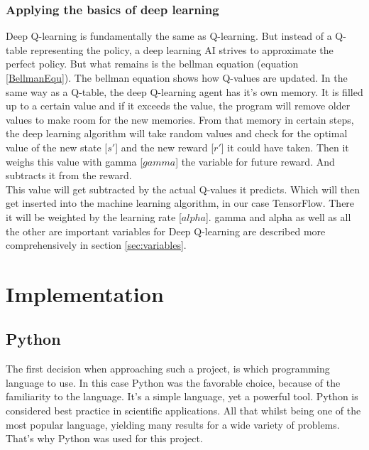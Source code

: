\documentclass[12pt]{article}
\def\alpha{alpha}%
\def\gamma{gamma}%
\begin{document}
\subsubsection{Applying the basics of deep learning}
\gls{Deep Q-learning} is fundamentally the same as \gls{Q-learning}. But instead of a \gls{Q-table} representing the \gls{policy}, a \gls{deep learning} \gls{AI} strives to approximate the perfect \gls{policy}. But what remains is the bellman equation (equation \ref{BellmanEqu}). The bellman equation shows how \glspl{Q-value} are updated. In the same way as a \gls{Q-table}, the deep \gls{Q-learning} agent has it's own \gls{memory}. It is filled up to a certain value and if it exceeds the value, the program will remove older values to make room for the new memories. From that \gls{memory} in certain steps, the \gls{deep learning} algorithm will take random values and check for the optimal value of the new \gls{state} [$s'$] and the new \gls{reward} [$r'$] it could have taken. Then it weighs this value with \gls{gamma} [$\gamma$] the variable for future \gls{reward}. And subtracts it from the \gls{reward}. \cite{bellmanEquValue} \\
This value will get subtracted by the actual \glspl{Q-value} it predicts. Which will then get inserted into the \gls{machine learning} algorithm, in our case TensorFlow. There it will be weighted by the \gls{learning rate} [$\alpha$]. \Gls{gamma} and \gls{alpha} as well as all the other are important variables for \gls{Deep Q-learning} are described more comprehensively in section \ref{sec:variables}.

\section{Implementation}
\subsection{Python}
The first decision when approaching such a project, is which programming language to use. In this case Python was the favorable choice, because of the familiarity to the language. It's a simple language, yet a powerful tool. Python is considered best practice in scientific applications. All that whilst being one of the most popular language, yielding many results for a wide variety of problems. That's why Python was used for this project. \cite{Python} 
\end{document}
